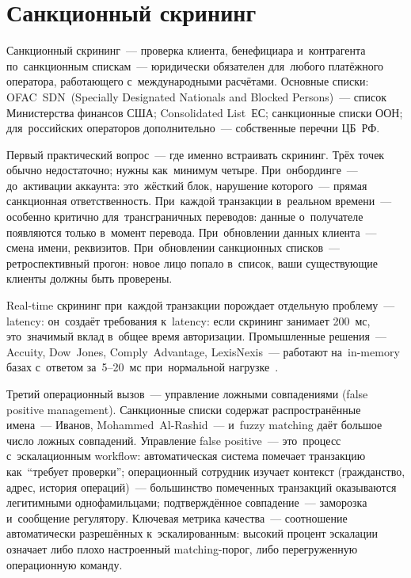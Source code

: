 \section{Санкционный скрининг}
\label{sec:compliance-sanctions}

Санкционный скрининг~--- проверка клиента, бенефициара и~контрагента
по~санкционным спискам~--- юридически обязателен для~любого платёжного
оператора, работающего с~международными расчётами. Основные списки:
OFAC~SDN~(Specially Designated Nationals and Blocked Persons)~---
список Министерства финансов США; Consolidated List~ЕС; санкционные
списки ООН; для~российских операторов дополнительно~--- собственные
перечни ЦБ~РФ.

Первый практический вопрос~--- где именно встраивать скрининг. Трёх точек обычно недостаточно;
нужны как~минимум четыре. При~онбординге~--- до~активации аккаунта:
это~жёсткий блок, нарушение которого~--- прямая санкционная ответственность.
При~каждой транзакции в~реальном времени~--- особенно критично для~трансграничных
переводов: данные о~получателе появляются только в~момент перевода.
При~обновлении данных клиента~--- смена имени, реквизитов. При~обновлении
санкционных списков~--- ретроспективный прогон: новое лицо попало в~список,
ваши существующие клиенты должны быть проверены.

Real-time скрининг при~каждой транзакции порождает отдельную проблему~--- latency: он~создаёт
требования к~latency: если скрининг занимает 200~мс, это~значимый вклад
в~общее время авторизации. Промышленные решения~--- Accuity, Dow~Jones,
Comply~Advantage, LexisNexis~--- работают на~in-memory базах с~ответом
за~5--20~мс при~нормальной нагрузке~.

Третий операционный вызов~--- управление ложными совпадениями (false positive management). Санкционные списки содержат распространённые
имена~--- Иванов, Mohammed~Al-Rashid~--- и~fuzzy matching даёт большое
число ложных совпадений. Управление false positive~---
это~процесс с~эскалационным workflow: автоматическая система помечает
транзакцию как~\enquote{требует проверки}; операционный сотрудник
изучает контекст (гражданство, адрес, история операций)~--- большинство
помеченных транзакций оказываются легитимными однофамильцами; подтверждённое
совпадение~--- заморозка и~сообщение регулятору. Ключевая метрика качества~---
соотношение автоматически разрешённых к~эскалированным: высокий процент
эскалации означает либо плохо настроенный matching-порог, либо перегруженную
операционную команду.


